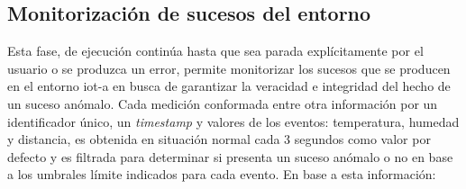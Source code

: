 \documentclass[12pt,a4paper, twoside]{report}
\begin{document}
	 \subsection{Monitorización de sucesos del entorno}
	 
	 Esta fase, de ejecución continúa hasta que sea parada explícitamente por el usuario o se produzca un error, permite monitorizar los sucesos que se producen en el entorno \gls{iot-a} en busca de garantizar la veracidad e integridad del hecho de un suceso anómalo. Cada medición conformada entre otra información por un identificador único, un \textit{timestamp} y valores de los eventos: temperatura, humedad y distancia, es obtenida en situación normal cada 3 segundos como valor por defecto y es filtrada para determinar si presenta un suceso anómalo o no en base a los umbrales límite indicados para cada evento. En base a esta información:
	 
\end{document}
